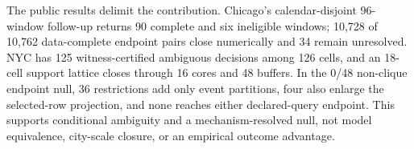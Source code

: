 The public results delimit the contribution. Chicago's calendar-disjoint
96-window follow-up returns 90 complete and six ineligible windows; 10,728 of
10,762 data-complete endpoint pairs close numerically and 34 remain unresolved.
NYC has 125 witness-certified ambiguous decisions among 126 cells, and an
18-cell support lattice closes through 16 cores and 48 buffers. In the 0/48
non-clique endpoint null, 36 restrictions add only event partitions, four also
enlarge the selected-row projection, and none reaches either declared-query
endpoint. This supports conditional ambiguity and a mechanism-resolved null,
not model equivalence, city-scale closure, or an empirical outcome advantage.
